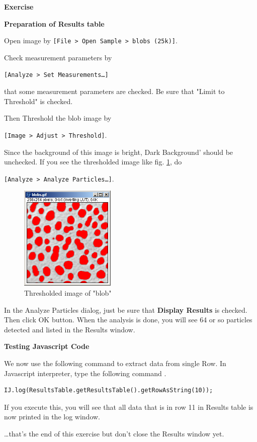 \documentclass[11pt,a4paper,oneside]{report}
\newenvironment{indentexercise}[1]%
{{\setlength{\leftmargin}{2em}}%
\textbf{Exercise \thesubsection-#1}%
\begin{list}{}%
	\item%
}
{\end{list}}
\newcommand{\ijmenu}[1]{\texttt{\small#1}}
\begin{document}
\begin{indentexercise}{1}

\textbf{Preparation of Results table}

Open image by \ijmenu{[File > Open Sample > blobs (25k)]}. 

Check measurement parameters by 

\ijmenu{[Analyze > Set Measurements\dots]}

that some measurement parameters are checked. Be sure that "Limit to Threshold" is checked. 

Then Threshold the blob image by 

\ijmenu{[Image > Adjust > Threshold]}. 

Since the background of this image is bright, Dark Background' should be unchecked. 
If you see the thresholded image like fig. \ref{fig:ThresBlob},  do 

\ijmenu{[Analyze > Analyze Particles\dots]}. 

\begin{figure}[htbp]
\begin{center}
\includegraphics[height=50mm]{fig2/ThrehsoldedBlob.png}
\caption{Thresholded image of "blob"}
\label{fig:ThresBlob}
\end{center}
\end{figure} 

In the Analyze Particles dialog, just be sure that \textbf{Display Results} is checked. 
Then click OK button. When the analysis is done, you will see  64 or so particles detected 
and listed in the Results window. 

\textbf{Testing Javascript Code}

We now use the following command to extract data from single Row. In Javascript
interpreter, type the following command .

\begin{lstlisting}[numbers=none]
IJ.log(ResultsTable.getResultsTable().getRowAsString(10));
\end{lstlisting}

If you execute this, you will see that all data that is in row 11 in Results table is 
now printed in the log window. 

\dots that's the end of this exercise but don't close the Results window yet.   
\end{indentexercise}
\end{document}
